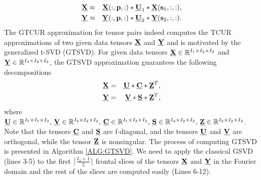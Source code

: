 \documentclass[preprint,12pt]{elsarticle}
\theoremstyle{definition}
\newcommand{\cX}{\underline{\bf X}}
\newcommand{\cY}{\underline{\bf Y}}
\newcommand{\cU}{\underline{\bf U}}
\begin{document}
\begin{eqnarray}\label{tgcur_i}
\cX&\approx &\cX(:,{\bf p},:)*\cU_1*\cX({\bf s}_1,:,:),\\\label{tgcur_ii}
\cY&\approx &\cY(:,{\bf p},:)*\cU_2*\cY({\bf s}_2,:,:).
\end{eqnarray}
The GTCUR approximation for tensor pairs indeed computes the TCUR approximations of two given data tensors $\cX$ and $\cY$ and is motivated by the generalized t-SVD (GTSVD). For given data tensors $\cX\in\mathbb{R}^{I_1\times I_2 \times I_3}$ and $\cY\in\mathbb{R}^{I_4\times I_2\times I_3}$, the GTSVD approximation  guarantees the following decompositions \cite{zhang2021cs}
\begin{eqnarray}\label{GTSVD_F}
\underline{\bf X}&=&\underline{\bf U}*\underline{\bf C}*\underline{\bf Z}^{T},\\\label{GTSVD_F2}
\underline{\bf Y}&=&\underline{\bf V}*\underline{\bf S}*\underline{\bf Z}^{T},
\end{eqnarray}
where $\underline{\bf U}\in\mathbb{R}^{I_1\times I_1\times I_3 },\,\underline{\bf V}\in\mathbb{R}^{I_4 \times I_4\times I_3 },\,\underline{\bf C}\in\mathbb{R}^{I_1\times I_2\times I_3 },\,\underline{\bf S}\in\mathbb{R}^{I_4\times I_2\times I_3 },\,\underline{\bf Z}\in\mathbb{R}^{I_2\times I_2\times I_3}$. Note that the tensors $\underline{\bf C}$ and $\underline{\bf S}$ are f-diagonal, and the tensors $\underline{\bf U}$ and $\underline{\bf V}$ are orthogonal, while the tensor $\underline{\bf Z}$ is nonsingular. The process of computing GTSVD is presented in Algorithm \ref{ALG:GTSVD}. We need to apply the classical GSVD (lines 3-5) to the first $\lceil \frac{I_3+1}{2}\rceil$ frontal slices of the tensors $\underline{\bf X}$ and $\underline{\bf Y}$ in the Fourier domain and the rest of the slices are computed easily (Lines 6-12). 
\LinesNumbered
\end{document}
